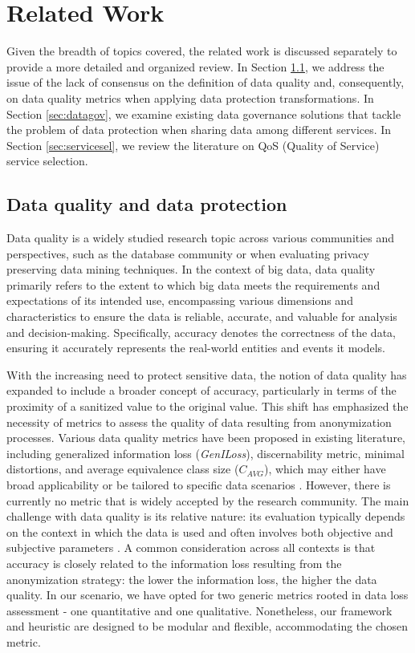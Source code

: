 \section{Related Work}\label{sec:related}

Given the breadth of topics covered, the related work is discussed separately to provide a more detailed and organized review. In Section  \ref{sec:dataquality}, we address the issue of the lack of consensus on the definition of data quality and, consequently, on data quality metrics when applying data protection transformations. In Section \ref{sec:datagov}, we examine existing data governance solutions that tackle the problem of data protection when sharing data among different services. In Section \ref{sec:servicesel}, we review the literature on QoS (Quality of Service) service selection.

\subsection{Data quality and data protection}\label{sec:dataquality}

Data quality is a widely studied research topic across various communities and perspectives, such as the database community or when evaluating privacy preserving data mining techniques. In the context of big data, data quality primarily refers to the extent to which big data meets the requirements and expectations of its intended use, encompassing various dimensions and characteristics to ensure the data is reliable, accurate, and valuable for analysis and decision-making. Specifically, accuracy denotes the correctness of the data, ensuring it accurately represents the real-world entities and events it models.

With the increasing need to protect sensitive data, the notion of data quality has expanded to include a broader concept of accuracy, particularly in terms of the proximity of a sanitized value to the original value. 
This shift has emphasized the necessity of metrics to assess the quality of data resulting from anonymization processes. Various data quality metrics have been proposed in existing literature, including generalized information loss (\textit{GenILoss}), discernability metric, minimal distortions, and average equivalence class size ($C_{AVG}$), which may either have broad applicability or be tailored to specific data scenarios \cite{Majeed2021AnonymizationTF,bookMetrics,reviewMetrics}. However, there is currently no metric that is widely accepted by the research community. The main challenge with data quality is its relative nature: its evaluation typically depends on the context in which the data is used and often involves both objective and subjective parameters \cite{dataAccuracy,dataQuality}.
%
A common consideration across all contexts is that accuracy is closely related to the information loss resulting from the anonymization strategy: the lower the information loss, the higher the data quality. In our scenario, we have opted for two generic metrics rooted in data loss assessment - one quantitative and one qualitative. Nonetheless, our framework and heuristic are designed to be modular and flexible, accommodating the chosen metric.

